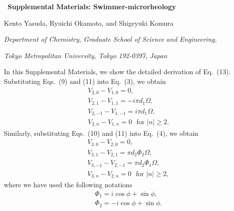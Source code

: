 \documentclass[nofootinbib,twocolumn,showpacs,preprintnumbers,pre,aps]{revtex4-1}
\begin{document}
\pagebreak

\onecolumngrid

\begin{center}
$\ $ 
{\large \textbf{Supplemental Materials: Swimmer-microrheology}}\\

$\ $ 

Kento Yasuda, Ryuichi Okamoto, and Shigeyuki Komura

\textit{Department of Chemistry, Graduate School of Science and Engineering,}

\textit{Tokyo Metropolitan University, Tokyo 192-0397, Japan}
\end{center}

\setcounter{equation}{0}
\renewcommand{\theequation}{S\arabic{equation}}   

\vspace{0.3in}

In this Supplemental Materials, we show the detailed derivation of Eq.~(13).
Substituting Eqs.~(9) and (11) into Eq.~(3), we obtain 
\begin{align}
&V_{2,0}-V_{1,0}=0, \\
&V_{2,1}-V_{1,1}=-i\pi d_1\Omega, \\
&V_{2,-1}-V_{1,-1}=i\pi d_1\Omega, \\
&V_{2,n}-V_{1,n}=0~~~\text{for $|n| \ge 2$}.
\label{eq1veT}
\end{align}
Similarly, substituting Eqs.~(10) and (11) into Eq.~(4), we obtain
\begin{align}
&V_{3,0}-V_{2,0}=0, \\
&V_{3,1}-V_{2,1}=\pi d_2\Phi_2\Omega, \\
&V_{3,-1}-V_{2,-1}=\pi d_2\Phi_1\Omega, \\
&V_{3,n}-V_{2,n}=0~~~\text{for $|n| \ge 2$}, 
\label{eq2veT}
\end{align}
where we have used the following notations
\begin{align}
&\Phi_1=i\cos\phi+\sin\phi, \\
&\Phi_2=-i\cos\phi+\sin\phi.
\end{align}
\end{document}
